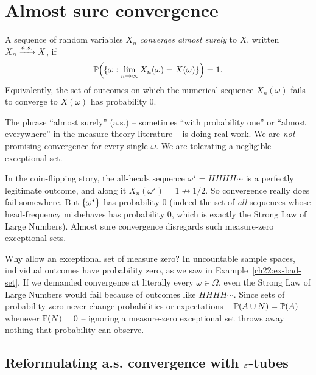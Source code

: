 \section{Almost sure convergence}
\label{ch22:as}

\begin{definition}
\label{ch22:def-as}
A sequence of random variables $X_n$ \emph{converges almost surely} to $X$, written
$X_n \asto X$, if
\[
  \P\!\left(\set{\omega : \lim_{n\to\infty} X_n(\omega) = X(\omega)}\right) = 1.
\]
Equivalently, the set of outcomes on which the numerical sequence $X_n(\omega)$ fails
to converge to $X(\omega)$ has probability $0$.
\end{definition}

The phrase ``almost surely'' (a.s.) -- sometimes ``with probability one'' or
``almost everywhere'' in the measure-theory literature -- is doing real work. We are
\emph{not} promising convergence for every single $\omega$. We are tolerating a
negligible exceptional set.

\begin{example}
\label{ch22:ex-bad-set}
In the coin-flipping story, the all-heads sequence $\omega^\star = HHHH\cdots$ is a
perfectly legitimate outcome, and along it $\bar X_n(\omega^\star) = 1 \not\to 1/2$.
So convergence really does fail somewhere. But $\set{\omega^\star}$ has probability
$0$ (indeed the set of \emph{all} sequences whose head-frequency misbehaves has
probability $0$, which is exactly the Strong Law of Large Numbers). Almost sure
convergence disregards such measure-zero exceptional sets.
\end{example}

\begin{whybox}
Why allow an exceptional set of measure zero?
In uncountable sample spaces, individual outcomes have probability zero, as we saw in
Example~\ref{ch22:ex-bad-set}. If we demanded convergence at literally every $\omega \in \Omega$,
even the Strong Law of Large Numbers would fail because of outcomes like $HHHH\cdots$.
Since sets of probability zero never change probabilities or expectations --
$\P(A \cup N) = \P(A)$ whenever $\P(N) = 0$ -- ignoring a measure-zero exceptional set
throws away nothing that probability can observe.
\end{whybox}

\subsection{Reformulating a.s. convergence with $\eps$-tubes}
\label{ch22:as-tube}

